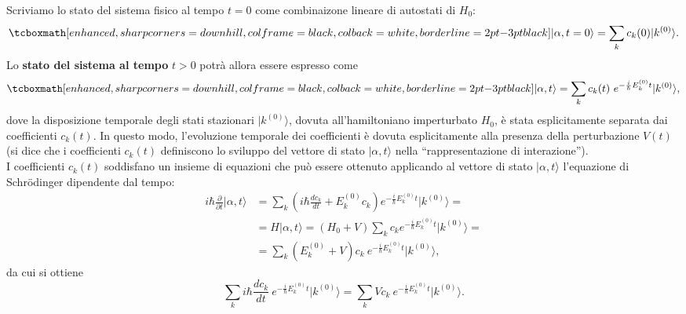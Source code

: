 \documentclass[a4paper,12pt,oneside]{book}
\begin{document}
Scriviamo lo stato del sistema fisico al tempo $t=0$ come combinaizone lineare di autostati di $H_0$:
	\begin{equation}
		\tcboxmath[enhanced, sharp corners=downhill, colframe=black, colback=white, borderline={2pt}{-3pt}{black}]{
			\vert \alpha ,t=0  \rangle = \sum _k c_k (0) \vert k ^{(0)} \rangle .
			}
	\label{eq:cap15_1}
	\end{equation}
Lo \textbf{stato del sistema al tempo} $t>0$ potrà allora essere espresso come
	\begin{equation}
		\tcboxmath[enhanced, sharp corners=downhill, colframe=black, colback=white, borderline={2pt}{-3pt}{black}]{
			\vert \alpha ,t  \rangle = \sum _k c_k (t)\ e^{-\frac{i}{\hbar}E_k ^{(0)} t } \vert k ^{(0)} \rangle ,
			}
	\label{eq:cap15_2}
	\end{equation}
dove la disposizione temporale degli stati stazionari $\vert k ^{(0)} \rangle$, dovuta all'hamiltoniano imperturbato $H_0$, è stata esplicitamente separata dai coefficienti $c_k {(t)}$. In questo modo, l'evoluzione temporale dei coefficienti è dovuta esplicitamente alla presenza della perturbazione $V(t)$  (si dice che i coefficienti $c_k (t)$ definiscono lo sviluppo del vettore di stato $\vert \alpha , t \rangle $ nella ``rappresentazione di interazione'').\\

I coefficienti $c_k (t)$ soddisfano un insieme di equazioni che può essere ottenuto applicando al vettore di stato $\vert \alpha , t \rangle $ l'equazione di Schr\"{o}dinger dipendente dal tempo:
	\begin{align}
		i\hbar \frac{\partial}{\partial t} \vert \alpha , t \rangle &= \sum _ k \left( i\hbar \frac{dc_k}{dt}+ E_k ^{(0)} c_k\right)e^{-\frac{i}{\hbar}E_k ^{(0)} t } \vert k ^{(0)} \rangle =\nonumber \\
		&=  H\vert \alpha , t \rangle  = \left( H_0 + V\right)\sum _k c_ke^{-\frac{i}{\hbar}E_k ^{(0)} t } \vert k ^{(0)} \rangle  = \nonumber \\
		&=   \sum _k \left( E_k ^{(0)}+ V\right)c_k\ e^{-\frac{i}{\hbar}E_k ^{(0)} t } \vert k ^{(0)} \rangle ,
	\end{align}
da cui si ottiene
\begin{equation}
\sum _ k i\hbar \frac{dc_k}{dt} \ e^{-\frac{i}{\hbar}E_k ^{(0)} t } \vert k ^{(0)} \rangle = \sum _ k V c_k\ e^{-\frac{i}{\hbar}E_k ^{(0)} t } \vert k ^{(0)} \rangle .
\end{equation}\\
\end{document}
